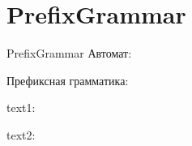 \section{PrefixGrammar}
\begin{frame}{PrefixGrammar}
	Автомат:


	Префиксная грамматика:


	text1:


	text2:


\end{frame}
